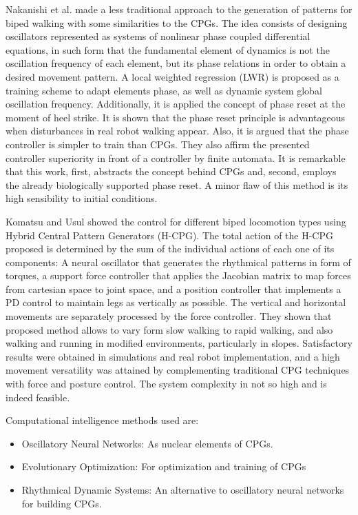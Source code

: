 Nakanishi et al. \cite{Nakanishi2004b} made a less traditional
approach to the generation of patterns for biped walking with some
similarities to the CPGs. The idea consists of designing oscillators
represented as systems of nonlinear phase coupled differential
equations, in such form that the fundamental element of dynamics is
not the oscillation frequency of each element, but its phase relations
in order to obtain a desired movement pattern. A local weighted
regression (LWR) is proposed as a training scheme to adapt elements
phase, as well as dynamic system global oscillation
frequency. Additionally, it is applied the concept of phase reset at
the moment of heel strike. It is shown that the phase reset principle
is advantageous when disturbances in real robot walking appear. Also,
it is argued that the phase controller is simpler to train than
CPGs. They also affirm the presented controller superiority in front
of a controller by finite automata. It is remarkable that this work,
first, abstracts the concept behind CPGs and, second, employs the
already biologically supported phase reset. A minor flaw of this
method is its high sensibility to initial conditions.


Komatsu and Usul \cite{Komatsu05Dynamic} showed the control for
different biped locomotion types using Hybrid Central Pattern
Generators (H-CPG). The total action of the H-CPG proposed is
determined by the sum of the individual actions of each one of its
components: A neural oscillator that generates the rhythmical patterns
in form of torques, a support force controller that applies the
Jacobian matrix to map forces from cartesian space to joint space, and
a position controller that implements a PD control to maintain legs as
vertically as possible. The vertical and horizontal movements are
separately processed by the force controller. They shown that proposed
method allows to vary form slow walking to rapid walking, and also
walking and running in modified environments, particularly in
slopes. Satisfactory results were obtained in simulations and real
robot implementation, and a high movement versatility was attained by
complementing traditional CPG techniques with force and posture
control. The system complexity in not so high and is indeed feasible.

Computational intelligence methods used are:
\begin{itemize}
\item Oscillatory Neural Networks: As nuclear elements of CPGs.
\item Evolutionary Optimization: For optimization and training of CPGs
\item Rhythmical Dynamic Systems: An alternative to oscillatory neural
  networks for building CPGs.
\end{itemize}
